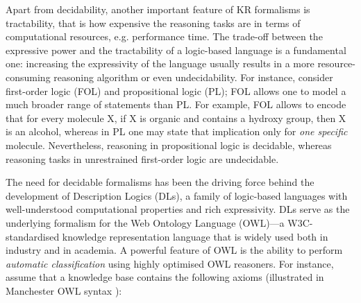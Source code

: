 \documentclass[10pt]{bmc_article}
\newenvironment{bmcformat}{\baselineskip20pt\sloppy\setboolean{publ}{false}}{\baselineskip20pt\sloppy}
\begin{document}
\begin{bmcformat}
Apart from decidability, another important feature of KR formalisms is tractability, that is how expensive the reasoning tasks are in terms of computational resources, e.g. performance time. The trade-off between the expressive power and the tractability of a logic-based language is a fundamental one: increasing the expressivity of the language usually results in a more resource-consuming reasoning algorithm or even undecidability. For instance, consider first-order logic (FOL) and propositional logic (PL); FOL allows one to model a much broader range of statements than PL. For example, FOL allows to encode that for every molecule X, if X is organic and contains a hydroxy group, then X is an alcohol, whereas in PL one may state that implication only for \emph{one specific} molecule. Nevertheless, reasoning in propositional logic is decidable, whereas reasoning tasks in unrestrained first-order logic are undecidable.

The need for decidable formalisms has been the driving force behind the development of Description Logics (DLs), a family of logic-based languages with well-understood computational properties and rich expressivity. DLs serve as the underlying formalism for the Web Ontology Language (OWL)---a W3C-standardised  knowledge representation language that is widely used both in industry and in academia. %
A powerful feature of OWL is the ability to perform \emph{automatic classification} using highly optimised OWL reasoners. For instance, assume that a knowledge base contains the following axioms (illustrated in Manchester OWL syntax \cite{horridgems2009}):


\end{bmcformat}
\end{document}
